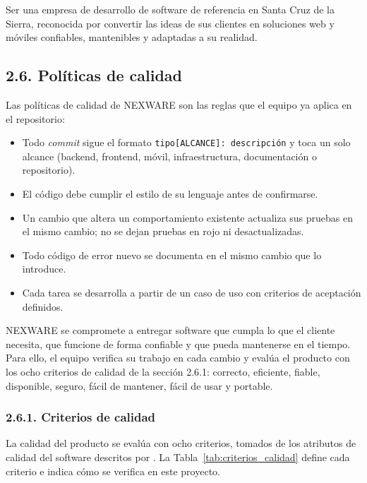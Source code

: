 Ser una empresa de desarrollo de software de referencia en Santa Cruz de la Sierra, reconocida por convertir las ideas de sus clientes en soluciones web y móviles confiables, mantenibles y adaptadas a su realidad.

\subsection{2.6. Políticas de calidad}

Las políticas de calidad de NEXWARE son las reglas que el equipo ya aplica en el repositorio:
\begin{itemize}
    \item Todo \textit{commit} sigue el formato \texttt{tipo[ALCANCE]: descripción} y toca un solo alcance (backend, frontend, móvil, infraestructura, documentación o repositorio).
    \item El código debe cumplir el estilo de su lenguaje antes de confirmarse.
    \item Un cambio que altera un comportamiento existente actualiza sus pruebas en el mismo cambio; no se dejan pruebas en rojo ni desactualizadas.
    \item Todo código de error nuevo se documenta en el mismo cambio que lo introduce.
    \item Cada tarea se desarrolla a partir de un caso de uso con criterios de aceptación definidos.
\end{itemize}
NEXWARE se compromete a entregar software que cumpla lo que el cliente necesita, que funcione de forma confiable y que pueda mantenerse en el tiempo. Para ello, el equipo verifica su trabajo en cada cambio y evalúa el producto con los ocho criterios de calidad de la sección 2.6.1: correcto, eficiente, fiable, disponible, seguro, fácil de mantener, fácil de usar y portable.

\subsubsection{2.6.1. Criterios de calidad}

La calidad del producto se evalúa con ocho criterios, tomados de los atributos de calidad del software descritos por \textcite{pressman2010ingenieria}. La Tabla~\ref{tab:criterios_calidad} define cada criterio e indica cómo se verifica en este proyecto.


